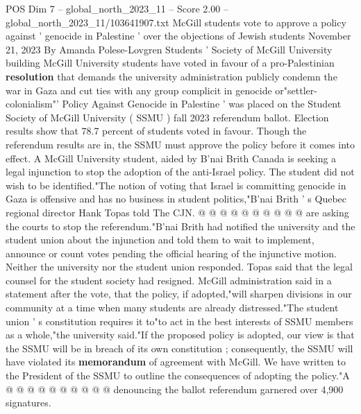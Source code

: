 \begin{textsample}{POS Dim 7 – global\_north\_2023\_11 – Score 2.00 – global\_north\_2023\_11/103641907.txt}  \label{ex:f7_pos_404}
McGill students vote to approve a policy against ' genocide in Palestine ' over the objections of Jewish students November 21, 2023 By Amanda Polese-Lovgren Students ' Society of McGill University building McGill University students have voted in favour of a pro-Palestinian \textbf{resolution} that demands the university administration publicly condemn the war in Gaza and cut ties with any group complicit in genocide or"settler-colonialism"' Policy Against Genocide in Palestine ' was placed on the Student Society of McGill University ( SSMU ) fall 2023 referendum ballot.
Election results show that 78.7 percent of students voted in favour.
Though the referendum results are in, the SSMU must approve the policy before it comes into effect.
A McGill University student, aided by B'nai Brith Canada is seeking a legal injunction to stop the adoption of the anti-Israel policy.
The student did not wish to be identified."The notion of voting that Israel is committing genocide in Gaza is offensive and has no business in student politics,"B'nai Brith ' s Quebec regional director Hank Topas told The CJN. @ @ @ @ @ @ @ @ @ @ are asking the courts to stop the referendum."B'nai Brith had notified the university and the student union about the injunction and told them to wait to implement, announce or count votes pending the official hearing of the injunctive motion.
Neither the university nor the student union responded.
Topas said that the legal counsel for the student society had resigned.
McGill administration said in a statement after the vote, that the policy, if adopted,"will sharpen divisions in our community at a time when many students are already distressed."The student union ' s constitution requires it to"to act in the best interests of SSMU members as a whole,"the university said."If the proposed policy is adopted, our view is that the SSMU will be in breach of its own constitution ; consequently, the SSMU will have violated its \textbf{memorandum} of agreement with McGill.
We have written to the President of the SSMU to outline the consequences of adopting the policy."A @ @ @ @ @ @ @ @ @ @ denouncing the ballot referendum garnered over 4,900 signatures.

\end{textsample}
